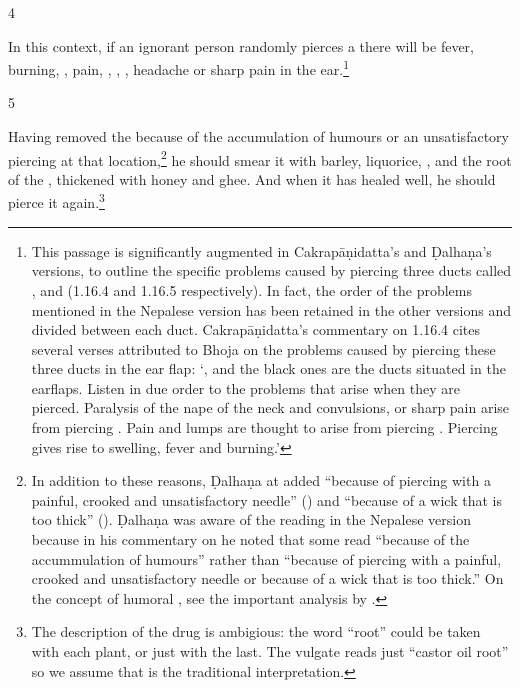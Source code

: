 \begin{translation}
\item [4] 
 
In this context, if an ignorant person randomly pierces a 
there will be fever, burning, , pain, 
,
, 
,
headache or sharp pain in the ear.\footnote{This passage is significantly
    augmented in Cakrapāṇidatta's and Ḍalhaṇa's versions, to outline the specific
    problems caused by piercing three ducts called ,  and
     (1.16.4 \citep[126]{acar-1939} and 1.16.5 \citep[77]{vulgate}
    respectively). In fact, the order of the problems mentioned in the Nepalese
    version has been retained in the other versions and divided between each duct.
    Cakrapāṇidatta's commentary on 1.16.4 \citep[126]{acar-1939} cites several verses
    attributed to Bhoja on the problems caused by piercing these three ducts in the
    ear flap: `,  and the black ones are the ducts
    situated in the earflaps.  Listen in due order to the problems that arise when
    they are pierced. Paralysis of the nape of the neck and convulsions, or sharp pain
    arise from piercing . Pain and lumps are thought to arise from
    piercing . Piercing  gives rise to swelling, fever and
    burning.'}
    
\item[5]     
    
Having removed the  because of the accumulation of humours or
an unsatisfactory piercing at that location,\footnote{In addition to these
    reasons, Ḍalhaṇa at  added “because of piercing with
    a painful, crooked and unsatisfactory needle”
    () and “because of a wick that is too
    thick” (). Ḍalhaṇa was aware of the reading in the
    Nepalese version because in his commentary on  he noted that
    some read “because of the accummulation of humours” rather than “because of
    piercing with a painful, crooked and unsatisfactory needle or because of a
    wick that is too thick.” On the concept of humoral
    , see the important analysis by \citet{meul-1992}.}
    he should smear it with barley, liquorice, , and the root of the ,
    thickened with honey and ghee. And when it has healed well, he should pierce
    it again.\footnote{The description of the drug is ambigious: the word “root”
        could be taken with each plant, or just with the last.  The vulgate reads just
        “castor oil root” so we assume that is the traditional interpretation.}
    

\end{translation}
